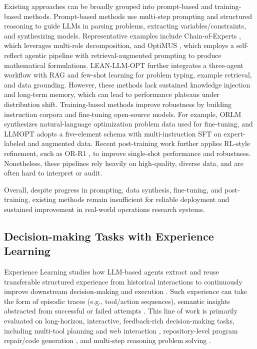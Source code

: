 \documentclass[sigconf, nonacm]{acmart}
\begin{document}
Existing approaches can be broadly grouped into prompt-based and training-based methods. Prompt-based methods use multi-step prompting and structured reasoning to guide LLMs in parsing problems, extracting variables/constraints, and synthesizing models. Representative examples include Chain-of-Experts \citep{xiao2023chain}, which leverages multi-role decomposition, and OptiMUS \citep{ahmaditeshnizi2024optimus}, which employs a self-reflect agentic pipeline with retrieval-augmented prompting to produce mathematical formulations. LEAN-LLM-OPT \citep{liang2026leanllmopt} further integrates a three-agent workflow with RAG and few-shot learning for problem typing, example retrieval, and data grounding. However, these methods lack sustained knowledge injection and long-term memory, which can lead to performance plateaus under distribution shift. Training-based methods improve robustness by building instruction corpora and fine-tuning open-source models. For example, ORLM \citep{huang2025orlm} synthesizes natural-language optimization problem data used for fine-tuning, and LLMOPT \citep{jiang2024llmopt} adopts a five-element schema with multi-instruction SFT on expert-labeled and augmented data. Recent post-training work further applies RL-style refinement, such as OR-R1 \citep{ding2025orr1}, to improve single-shot performance and robustness. Nonetheless, these pipelines rely heavily on high-quality, diverse data, and are often hard to interpret or audit.

Overall, despite progress in prompting, data synthesis, fine-tuning, and post-training, existing methods remain insufficient for reliable deployment and sustained improvement in real-world operations research systems.
\subsection{Decision-making Tasks with Experience Learning}
Experience Learning studies how LLM-based agents extract and reuse transferable structured experience from historical interactions to continuously improve downstream decision-making and execution \citep{zhao2023expel, shinn2023reflexion}. Such experience can take the form of episodic traces \citep{park2023generative} (e.g., tool/action sequences), semantic insights abstracted from successful or failed attempts \citep{zhao2023expel}. This line of work is primarily evaluated on long-horizon, interactive, feedback-rich decision-making tasks, including multi-tool planning and web interaction \citep{qin2023toolllm, zhou2023webarena},  repository-level program repair/code generation \citep{jimenez2023swebench}, and multi-step reasoning problem solving \citep{shinn2023reflexion, wang2024awm}.
\end{document}
